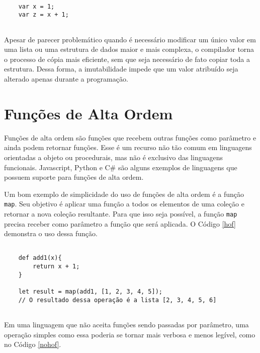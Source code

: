 \begin{lstlisting}[caption={Exemplo de Código Imutável.},label=imutablevar]

    var x = 1;
    var z = x + 1;


\end{lstlisting}

Apesar de parecer problemático quando é necessário 
modificar um único valor em uma lista ou uma estrutura 
de dados maior e mais complexa, o compilador torna o 
processo de cópia mais eficiente, sem que seja 
necessário de fato copiar toda a estrutura\cite{functionalscala}. 
Dessa forma, a imutabilidade impede que um valor 
atribuído seja alterado apenas durante a 
programação.


\section{Funções de Alta Ordem}

Funções de alta ordem são funções que recebem 
outras funções como parâmetro e ainda podem 
retornar funções\cite{realworldhaskell, functionalscala}. 
Esse é um recurso 
não tão comum em linguagens orientadas a 
objeto ou procedurais, mas não é exclusivo das 
linguagens funcionais. Javascript\cite{eloquentjs}, 
Python\cite{denerocomposing} e C\#\cite{buonannofunctcsharp}
são alguns exemplos de linguagens que possuem suporte 
para funções de alta ordem.

Um bom exemplo de simplicidade do uso de 
funções de alta ordem é a função \texttt{map}\cite{hofscala}. Seu objetivo 
é aplicar uma função a todos os elementos de uma 
coleção e retornar a nova coleção resultante. 
Para que isso seja possível, a função \texttt{map} precisa 
receber como parâmetro a função que será aplicada. 
O Código \ref{hof} demonstra o uso dessa função.

\begin{lstlisting}[caption={Exemplo de Função de Alta Ordem.},label=hof]

    def add1(x){
        return x + 1;
    }

    let result = map(add1, [1, 2, 3, 4, 5]);
    // O resultado dessa operação é a lista [2, 3, 4, 5, 6]
        

\end{lstlisting}

Em uma linguagem que não aceita funções sendo 
passadas por parâmetro, uma operação simples como 
essa poderia se tornar mais verbosa e menos legível, 
como no Código \ref{nohof}.

